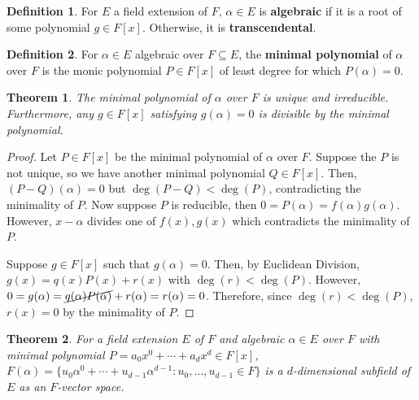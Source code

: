 \documentclass[
    parskip=half,
    toc=flat,
    toc=sectionentrydotfill,
]{scrartcl}  %
\theoremstyle{definition}
\newtheorem{definition}{Definition}[section]
\theoremstyle{plain}
\newtheorem{theorem}{Theorem}[definition]
\theoremstyle{remark}
\begin{document}
\begin{definition}
    For $E$ a field extension of $F$, $\alpha\in E$ is \textbf{algebraic} if it is a root of some
    polynomial $g\in F[x]$.
    Otherwise, it is \textbf{transcendental}.
\end{definition}

\begin{definition}
    For $\alpha\in E$ algebraic over $F\subseteq E$, the \textbf{minimal polynomial} of
    $\alpha$ over $F$ is the monic polynomial $P\in F[x]$ of least degree for which $P(\alpha)=0$.
\end{definition}

\begin{theorem}
    \label{thm:minimal polynomial is unique and irreducible}
    The minimal polynomial of $\alpha$ over $F$ is unique and irreducible.
    Furthermore, any $g\in F[x]$ satisfying $g(\alpha)=0$ is divisible by the minimal polynomial.
\end{theorem}

\begin{proof}
    Let $P\in F[x]$ be the minimal polynomial of $\alpha$ over $F$.
    Suppose the $P$ is not unique, so we have another minimal polynomial $Q\in F[x]$.
    Then, $(P-Q)(\alpha)=0$ but $\deg(P-Q)<\deg(P)$, contradicting the minimality of $P$.
    Now suppose $P$ is reducible, then $0=P(\alpha)=f(\alpha)g(\alpha)$.
    However, $x-\alpha$ divides one of $f(x),g(x)$ which contradicts the minimality of $P$.

    Suppose $g\in F[x]$ such that $g(\alpha)=0$.
    Then, by Euclidean Division, $g(x)=q(x)P(x)+r(x)$ with $\deg(r)<\deg(P)$.
    However, $0=g(\alpha)=\cancel{q(\alpha)P(\alpha)}+r(\alpha)=r(\alpha)=0$.
    Therefore, since $\deg(r)<\deg(P)$, $r(x)=0$ by the minimality of $P$.
\end{proof}

\begin{theorem}
    For a field extension $E$ of $F$ and algebraic $\alpha\in E$ over $F$ with minimal polynomial
    $P=a_0x^0+\cdots+a_dx^d\in F[x]$,
    $F(\alpha)=\{u_0\alpha^0+\cdots+u_{d-1}\alpha^{d-1}:u_0,\dots,u_{d-1}\in F\}$ is a
    $d$-dimensional subfield of $E$
    as an $F$-vector space.
\end{theorem}
\end{document}
